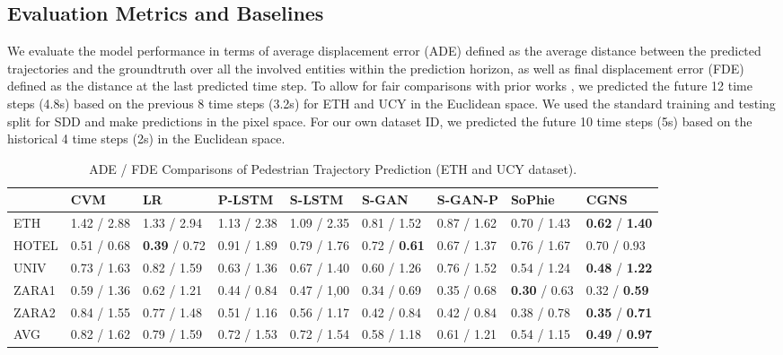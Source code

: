\documentclass[letterpaper, 10 pt, conference]{ieeeconf}
\begin{document}
\subsection{Evaluation Metrics and Baselines}
We evaluate the model performance in terms of average displacement error (ADE) defined as the average distance between the predicted trajectories and the groundtruth over all the involved entities within the prediction horizon, as well as final displacement error (FDE) defined as the distance at the last predicted time step.
To allow for fair comparisons with prior works \cite{A1,A8,A9}, we predicted the future 12 time steps (4.8s) based on the previous 8 time steps (3.2s) for ETH and UCY in the Euclidean space. We used the standard training and testing split for SDD and make predictions in the pixel space.
For our own dataset ID, we predicted the future 10 time steps (5s) based on the historical 4 time steps (2s) in the Euclidean space.
\begin{table*}[!tbp]
	\small
	\label{tab:feature}
	\caption{ADE / FDE Comparisons of Pedestrian Trajectory Prediction (ETH and UCY dataset).}
	\vspace{-0.5cm}
	\begin{center}
		\begin{tabular}{m{1.2cm}<{\centering}| m{1.5cm}<{\centering}| m{1.5cm}<{\centering}| m{1.5cm}<{\centering}| m{1.5cm}<{\centering}| m{1.5cm}<{\centering}| m{1.5cm}<{\centering}| m{1.5cm}<{\centering}| m{1.5cm}<{\centering} }
			\toprule
			\midrule
			&  CVM & LR & P-LSTM & S-LSTM & S-GAN & S-GAN-P  & SoPhie  & \textbf{CGNS}\\ \midrule 
			ETH   & 1.42 / 2.88 &  1.33 / 2.94 & 1.13 / 2.38 & 1.09 / 2.35 & 0.81 / 1.52 & 0.87 / 1.62 & 0.70 / 1.43 & \textbf{0.62} / \textbf{1.40} \\ 
			HOTEL & 0.51 / 0.68 &  \textbf{0.39} / 0.72 & 0.91 / 1.89 & 0.79 / 1.76 & 0.72 / \textbf{0.61} & 0.67 / 1.37 & 0.76 / 1.67 & 0.70 / 0.93 \\ 
			UNIV  & 0.73 / 1.63 &  0.82 / 1.59 & 0.63 / 1.36 & 0.67 / 1.40 & 0.60 / 1.26 & 0.76 / 1.52 & 0.54 / 1.24 & \textbf{0.48} / \textbf{1.22}\\ 
			ZARA1 & 0.59 / 1.36 &  0.62 / 1.21 & 0.44 / 0.84 & 0.47 / 1,00 & 0.34 / 0.69 & 0.35 / 0.68 & \textbf{0.30} / 0.63 & 0.32 / \textbf{0.59} \\
			ZARA2 & 0.84 / 1.55 &  0.77 / 1.48 & 0.51 / 1.16 & 0.56 / 1.17 & 0.42 / 0.84 & 0.42 / 0.84 & 0.38 / 0.78 & \textbf{0.35} / \textbf{0.71} \\
			\midrule
			AVG   & 0.82 / 1.62 &  0.79 / 1.59 & 0.72 / 1.53 & 0.72 / 1.54 & 0.58 / 1.18 & 0.61 / 1.21 & 0.54 / 1.15 & \textbf{0.49} / \textbf{0.97} \\   
			\bottomrule
		\end{tabular}
	\end{center}
	\vspace{-0.4cm}
\end{table*}
\end{document}
